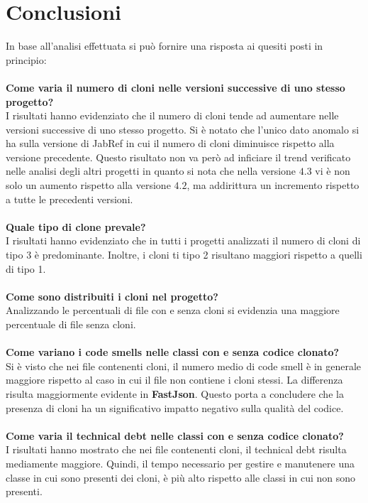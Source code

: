 \chapter{Conclusioni}\label{cap5}
In base all'analisi effettuata si può fornire una risposta ai quesiti posti in principio: \\ \\
\textbf{Come varia il numero di cloni nelle versioni successive di uno stesso progetto?}\\ 
I risultati hanno evidenziato che il numero di cloni tende ad aumentare nelle versioni successive di uno stesso progetto. Si è notato che l'unico dato anomalo si ha sulla versione di JabRef in cui il numero di cloni diminuisce rispetto alla versione precedente. Questo risultato non va però ad inficiare il trend verificato nelle analisi degli altri progetti in quanto si nota che nella versione $4.3$ vi è non solo un aumento rispetto alla versione $4.2$, ma addirittura un incremento rispetto a tutte le precedenti versioni. \\ \\
\textbf{Quale tipo di clone prevale?}\\
I risultati hanno evidenziato che in tutti i progetti analizzati il numero di cloni di tipo 3 è predominante. Inoltre, i cloni ti tipo 2 risultano maggiori rispetto a quelli di tipo 1.\\ \\
\textbf{Come sono distribuiti i cloni nel progetto?}\\ 
Analizzando le percentuali di file con e senza cloni si evidenzia una maggiore percentuale di file senza cloni. \\ \\
\textbf{Come variano i code smells nelle classi con e senza codice clonato?}\\
Si è visto che nei file contenenti cloni, il numero medio di code smell è in generale maggiore rispetto al caso in cui il file non contiene i cloni stessi. La differenza risulta maggiormente evidente in \textbf{FastJson}. Questo porta a concludere che la presenza di cloni ha un significativo impatto negativo sulla qualità del codice. \\ \\
\textbf{Come varia il technical debt nelle classi con e senza codice clonato?}\\
I risultati hanno mostrato che nei file contenenti cloni, il technical debt risulta mediamente maggiore. Quindi, il tempo necessario per gestire e manutenere una classe in cui sono presenti dei cloni, è più alto rispetto alle classi in cui non sono presenti. \newpage
